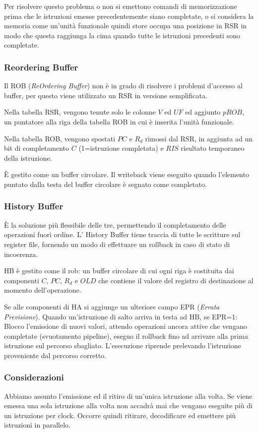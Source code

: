 \documentclass[../template]{subfiles}
\begin{document}
Per risolvere questo problema o non si emettono comandi di memorizzazione prima che le istruzioni emesse precedentemente
siano completate, o si considera la memoria come un'unità funzionale quindi store occupa una posizione in RSR in modo
che questa raggiunga la cima quando tutte le istruzioni precedenti sono completate.

\subsubsection{Reordering Buffer}
Il ROB (\textit{ReOrdering Buffer}) non è in grado di risolvere i problemi d'accesso al buffer, per questo viene utilizzato un RSR in versione
semplificata.

Nella tabella RSR, vengono tenute solo le colonne $V$ ed $UF$ ed aggiunto $pROB$, un puntatore alla riga
della tabella ROB in cui è inserita l'unità funzionale.

Nella tabella ROB, vengono spostati $PC$ e $R_d$ rimossi dal RSR, in aggiunta ad un bit di completamento $C$
(1=istruzione completata) e $RIS$ risultato temporaneo della istruzione.

È gestito come un buffer circolare. Il writeback viene eseguito quando l'elemento puntato dalla testa del buffer
circolare è segnato come completato.

\subsubsection{History Buffer}
È la soluzione più flessibile delle tre, permettendo il completamento delle operazioni fuori ordine.
L' History Buffer tiene traccia di tutte le scritture sul register file, fornendo un modo di effettuare un rollback in caso di stato di incoerenza.

HB è gestito come il rob: un buffer circolare di cui ogni riga è costituita dai componenti $C$, $PC$, $R_d$ e $OLD$ che
contiene il valore del registro di destinazione al momento dell'operazione.

Se alle componenti di HA si aggiunge un ulteriore campo EPR (\textit{Errata Previsione}). Quando un'istruzione di salto
arriva in testa ad HB, se EPR=1: Blocco l'emissione di nuovi valori, attendo operazioni ancora attive che vengano
completate (svuotamento pipeline), eseguo il rollback fino ad arrivare alla prima istruzione sul percorso sbagliato.
L'esecuzione riprende prelevando l'istruzione proveniente dal percorso corretto.


\subsubsection{Considerazioni}
Abbiamo assunto l'emissione ed il ritiro di un'unica istruzione alla volta. Se viene emessa una sola istruzione alla
volta non accadrà mai che vengano eseguite più di un istruzione per clock. Occorre quindi ritirare, decodificare ed emettere più
istruzioni in parallelo.
\end{document}
